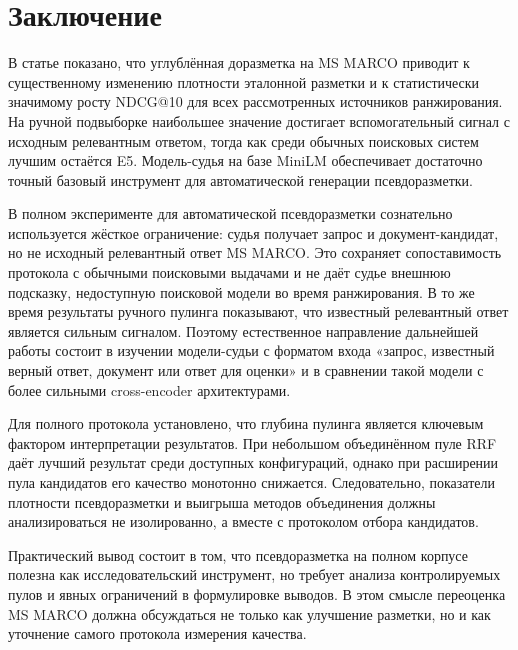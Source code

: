 \documentclass[runningheads,a4paper]{llncs}
\begin{document}
\section{Заключение}

В статье показано, что углублённая доразметка на MS MARCO приводит к существенному изменению плотности эталонной разметки и к статистически значимому росту NDCG@10 для всех рассмотренных источников ранжирования. На ручной подвыборке наибольшее значение достигает вспомогательный сигнал с исходным релевантным ответом, тогда как среди обычных поисковых систем лучшим остаётся E5. Модель-судья на базе MiniLM обеспечивает достаточно точный базовый инструмент для автоматической генерации псевдоразметки.

В полном эксперименте для автоматической псевдоразметки сознательно используется жёсткое ограничение: судья получает запрос и документ-кандидат, но не исходный релевантный ответ MS MARCO. Это сохраняет сопоставимость протокола с обычными поисковыми выдачами и не даёт судье внешнюю подсказку, недоступную поисковой модели во время ранжирования. В то же время результаты ручного пулинга показывают, что известный релевантный ответ является сильным сигналом. Поэтому естественное направление дальнейшей работы состоит в изучении модели-судьи с форматом входа «запрос, известный верный ответ, документ или ответ для оценки» и в сравнении такой модели с более сильными cross-encoder архитектурами.

Для полного протокола установлено, что глубина пулинга является ключевым фактором интерпретации результатов. При небольшом объединённом пуле RRF даёт лучший результат среди доступных конфигураций, однако при расширении пула кандидатов его качество монотонно снижается. Следовательно, показатели плотности псевдоразметки и выигрыша методов объединения должны анализироваться не изолированно, а вместе с протоколом отбора кандидатов.

Практический вывод состоит в том, что псевдоразметка на полном корпусе полезна как исследовательский инструмент, но требует анализа контролируемых пулов и явных ограничений в формулировке выводов. В этом смысле переоценка MS MARCO должна обсуждаться не только как улучшение разметки, но и как уточнение самого протокола измерения качества.
\end{document}

